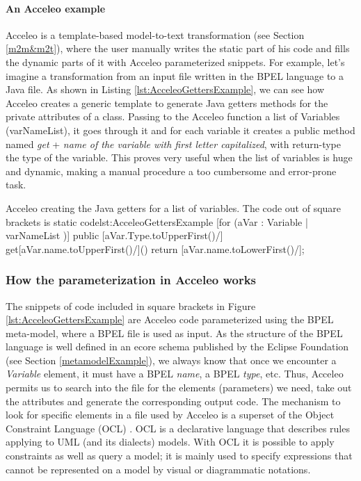 \paragraph{An Acceleo example}
Acceleo is a template-based model-to-text transformation (see Section \ref{m2m&m2t}), where the user manually writes the static part of his code and fills the dynamic parts of it with Acceleo parameterized snippets.
For example, let's imagine a transformation from an input file written in the BPEL language to a Java file. As shown in Listing \ref{lst:AcceleoGettersExample}, we can see how Acceleo creates a generic template to generate Java getters methods for the private attributes of a class. Passing to the Acceleo function a list of Variables (varNameList), it goes through it and for each variable it creates a public method named \textit{get} + \textit{name of the variable with first letter capitalized}, with return-type the type of the variable. This proves very useful when the list of variables is huge and dynamic, making a manual procedure a too cumbersome and error-prone task.

\begin{workflow-code}{Acceleo creating the Java getters for a list of variables. The code out of square brackets is static code}{lst:AcceleoGettersExample}
[for (aVar : Variable | varNameList )]
public [aVar.Type.toUpperFirst()/] get[aVar.name.toUpperFirst()/]() {
	return [aVar.name.toLowerFirst()/];
}
\end{workflow-code}

\subsubsection{How the parameterization in Acceleo works}
\label{AcceleoParametirazion}
The snippets of code included in square brackets in Figure \ref{lst:AcceleoGettersExample} are Acceleo code parameterized using the BPEL meta-model, where a BPEL file is used as input. As the structure of the BPEL language is well defined in an ecore schema published by the Eclipse Foundation (see Section \ref{metamodelExample}), we always know that once we encounter a \textit{Variable} element, it must have a BPEL \textit{name}, a BPEL \textit{type}, etc. 
Thus, Acceleo permits us to search into the file for the elements (parameters) we need, take out the attributes and generate the corresponding output code.
The mechanism to look for specific elements in a file used by Acceleo is a superset of the Object Constraint Language (OCL) \cite{UML20OCL}. OCL is a declarative language that describes rules applying to UML (and its dialects) models. With OCL it is possible to apply constraints as well as query a model; it is mainly used to specify expressions that cannot be represented on a model by visual or diagrammatic notations.

